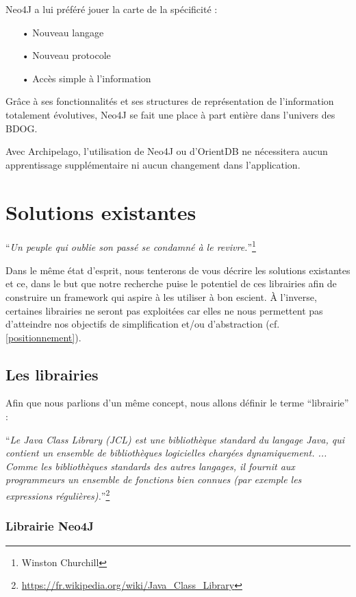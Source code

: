 \documentclass[a4paper,fleqn,12pt,oneside]{report}
\begin{document}
Neo4J a lui préféré jouer la carte de la spécificité :
\begin{itemize}
\item[•] Nouveau langage
\item[•] Nouveau protocole
\item[•] Accès simple à l'information
\end{itemize}
Grâce à ses fonctionnalités et ses structures de représentation de l'information totalement évolutives, Neo4J se fait une place à part entière dans l'univers des BDOG.

Avec Archipelago, l'utilisation de Neo4J ou d'OrientDB ne nécessitera aucun apprentissage supplémentaire ni aucun changement dans l'application.

\chapter{Solutions existantes}
\begin{center}
\enquote{\textit{Un peuple qui oublie son passé se condamné à le revivre.}}\footnote{Winston Churchill}
\end{center}

Dans le même état d'esprit, nous tenterons de vous décrire les solutions existantes et ce, dans le but que notre recherche puise le potentiel de ces librairies afin de construire un framework qui aspire à les utiliser à bon escient.  À l'inverse, certaines librairies ne seront pas exploitées car elles ne nous permettent pas d'atteindre nos objectifs de simplification et/ou d'abstraction (cf. \ref{positionnement}).

\section{Les librairies} 

Afin que nous parlions d'un même concept, nous allons définir le terme \enquote{librairie} : 

\enquote{\textit{Le Java Class Library (JCL) est une bibliothèque standard du langage Java, qui contient un ensemble de bibliothèques logicielles chargées dynamiquement. ... Comme les bibliothèques standards des autres langages, il fournit aux programmeurs un ensemble de fonctions bien connues (par exemple les expressions régulières).}}\footnote{\url{https://fr.wikipedia.org/wiki/Java_Class_Library}}


\subsection{Librairie Neo4J}
\end{document}
